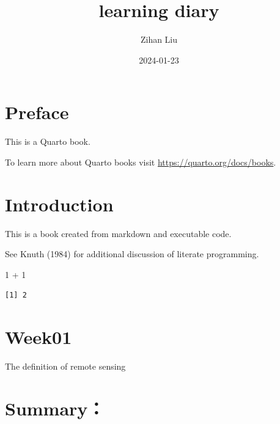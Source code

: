 \documentclass[
  letterpaper,
  DIV=11,
  numbers=noendperiod]{scrreprt}
\title{learning diary}
\author{Zihan Liu}
\date{2024-01-23}
\newenvironment{Shaded}{\begin{snugshade}}{\end{snugshade}}
\newcommand{\DecValTok}[1]{\textcolor[rgb]{0.68,0.00,0.00}{#1}}
\newcommand{\SpecialCharTok}[1]{\textcolor[rgb]{0.37,0.37,0.37}{#1}}
\renewcommand*\contentsname{Table of contents}
\newcommand\contentsname{Table of contents}
\begin{document}
\maketitle

\renewcommand*\contentsname{Table of contents}
{
\hypersetup{linkcolor=}
\setcounter{tocdepth}{2}
\tableofcontents
}

\chapter*{Preface}\label{preface}


This is a Quarto book.

To learn more about Quarto books visit
\url{https://quarto.org/docs/books}.


\chapter{Introduction}\label{introduction}

This is a book created from markdown and executable code.

See Knuth (1984) for additional discussion of literate programming.

\begin{Shaded}
\begin{Highlighting}[]
\DecValTok{1} \SpecialCharTok{+} \DecValTok{1}
\end{Highlighting}
\end{Shaded}

\begin{verbatim}
[1] 2
\end{verbatim}


\chapter{Week01}\label{week01}

The definition of remote sensing


\chapter{Summary：}\label{summary}
\end{document}
